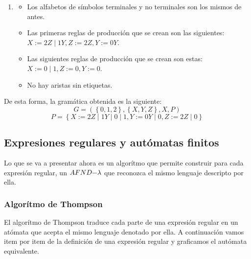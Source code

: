\documentclass[12pt]{article}
\begin{document}
\begin{enumerate}[1.]
  \item \begin{itemize}
    \item Los alfabetos de símbolos terminales y no terminales son los mismos de antes.

    \item Las primeras reglas de producción que se crean son las siguientes: $ X:=2Z \mid 1Y, Z:=2Z,Y:=0Y $.

    \item Las siguientes reglas de producción que se crean son estas: $ X:=0 \mid 1, Z:=0, Y:=0 $.

    \item No hay aristas sin etiquetas.
  \end{itemize}
\end{enumerate}

De esta forma, la gramática obtenida es la siguiente:
\[
G=\left(\left\{0,1,2\right\},\left\{X,Y,Z\right\},X,P\right)
\]
\[
P=\left\{X:=2Z \mid 1Y \mid 0 \mid 1,Y:=0Y \mid 0,Z:=2Z \mid 0\right\}
\]

\subsection{Expresiones regulares y autómatas finitos}
Lo que se va a presentar ahora es un algorítmo que permite construir para cada expresión regular, un $ AFND\text{{\textminus}}\lambda $ que reconozca el mismo lenguaje descripto por ella.

\subsubsection{Algorítmo de Thompson}
El algorítmo de Thompson traduce cada parte de una expresión regular en un atómata que acepta el mismo lenguaje denotado por ella.
A continuación vamos item por item de la definición de una expresión regular y graficamos el autómata equivalente.
\end{document}

